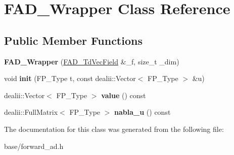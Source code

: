 \hypertarget{classFAD__Wrapper}{}\section{F\+A\+D\+\_\+\+Wrapper Class Reference}
\label{classFAD__Wrapper}
\subsection*{Public Member Functions}
\begin{DoxyCompactItemize}
\item 
\mbox{\label{classFAD__Wrapper_a262641e4023286cb5afb6231d3bc4d17}} 
{\bfseries F\+A\+D\+\_\+\+Wrapper} (\hyperlink{structFAD__TdVecField}{F\+A\+D\+\_\+\+Td\+Vec\+Field} \&\+\_\+f, size\+\_\+t \+\_\+dim)
\item 
\mbox{\label{classFAD__Wrapper_a6b827f58408ccdfc2b612c80eb7f6e40}} 
void {\bfseries init} (F\+P\+\_\+\+Type t, const dealii\+::\+Vector$<$ F\+P\+\_\+\+Type $>$ \&u)
\item 
\mbox{\label{classFAD__Wrapper_a5e9dc9c12a394675cecf7067c69afe1d}} 
dealii\+::\+Vector$<$ F\+P\+\_\+\+Type $>$ {\bfseries value} () const
\item 
\mbox{\label{classFAD__Wrapper_af24fb7ea126858854de26204f1ccd633}} 
dealii\+::\+Full\+Matrix$<$ F\+P\+\_\+\+Type $>$ {\bfseries nabla\+\_\+u} () const
\end{DoxyCompactItemize}


The documentation for this class was generated from the following file\+:\begin{DoxyCompactItemize}
\item 
base/forward\+\_\+ad.\+h\end{DoxyCompactItemize}
